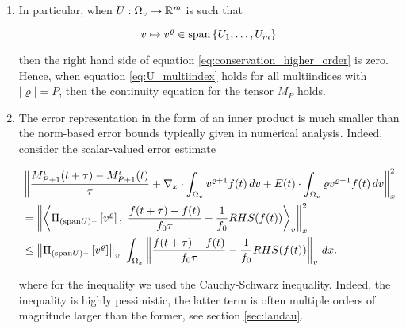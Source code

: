 \begin{remark}
    \begin{enumerate}
        \item In particular, when $U : \Omega_v \to \mathbb{R}^m$ is such that 

            \begin{equation}\label{eq:U_multiindex}
                v \mapsto v^\varrho \in \text{span} \left\{ U_1, \ldots, U_m \right\} 
            \end{equation}
            
            then the right hand side of equation \ref{eq:conservation_higher_order} 
            is zero. Hence, when equation \ref{eq:U_multiindex} holds for all 
            multiindices with $\left| \varrho \right| = P$, then the continuity 
            equation for the tensor $M_P$ holds. 
        \item The error representation in the form of an inner product is much 
            smaller than the norm-based error bounds typically given in numerical 
            analysis. Indeed, consider the scalar-valued error estimate

            \begin{equation}\label{eq:pessimistic_error}
                \begin{split}
                    &\left\| 
                        \frac{M_{P+1}^\iota (t + \tau) - M_{P+1}^\iota (t)}{\tau} 
                        + \nabla_x \cdot \int_{\Omega_v} v^{\varrho + 1} f(t) \,dv 
                        + E(t) \cdot \int_{\Omega_v} \varrho v^{\varrho - 1} f(t) \,dv
                    \right\|_x^2 \\ 
                    &= \left\| 
                        \left\langle 
                        \Pi_{(\spn U)^\perp} \left[ v^\varrho \right],\ 
                        \frac{f(t + \tau) - f(t)}{f_0 \tau} - \frac{1}{f_0} RHS (f(t))
                        \right\rangle_v 
                     \right\|_x^2 \\ 
                    &\leq \left\| \Pi_{(\spn U)^\perp} \left[ v^\varrho \right] \right\|_v \ 
                    \int_{\Omega_x} \left\| \frac{f(t + \tau) - f(t)}{f_0 \tau} - \frac{1}{f_0} RHS (f(t)) \right\|_v \,dx . 
                \end{split}
            \end{equation}

            where for the inequality we used the Cauchy-Schwarz inequality. 
            Indeed, the inequality is highly pessimistic, the latter term is 
            often multiple orders of magnitude larger than the former, see 
            section \ref{sec:landau}. 
    \end{enumerate}
\end{remark}

